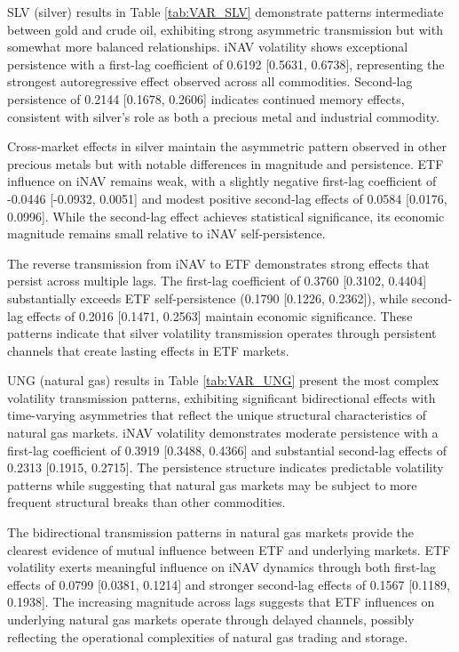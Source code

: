 SLV (silver) results in Table \ref{tab:VAR_SLV} demonstrate patterns intermediate between gold and crude oil, exhibiting strong asymmetric transmission but with somewhat more balanced relationships. iNAV volatility shows exceptional persistence with a first-lag coefficient of 0.6192 [0.5631, 0.6738], representing the strongest autoregressive effect observed across all commodities. Second-lag persistence of 0.2144 [0.1678, 0.2606] indicates continued memory effects, consistent with silver's role as both a precious metal and industrial commodity.

Cross-market effects in silver maintain the asymmetric pattern observed in other precious metals but with notable differences in magnitude and persistence. ETF influence on iNAV remains weak, with a slightly negative first-lag coefficient of -0.0446 [-0.0932, 0.0051] and modest positive second-lag effects of 0.0584 [0.0176, 0.0996]. While the second-lag effect achieves statistical significance, its economic magnitude remains small relative to iNAV self-persistence.

The reverse transmission from iNAV to ETF demonstrates strong effects that persist across multiple lags. The first-lag coefficient of 0.3760 [0.3102, 0.4404] substantially exceeds ETF self-persistence (0.1790 [0.1226, 0.2362]), while second-lag effects of 0.2016 [0.1471, 0.2563] maintain economic significance. These patterns indicate that silver volatility transmission operates through persistent channels that create lasting effects in ETF markets.

UNG (natural gas) results in Table \ref{tab:VAR_UNG} present the most complex volatility transmission patterns, exhibiting significant bidirectional effects with time-varying asymmetries that reflect the unique structural characteristics of natural gas markets. iNAV volatility demonstrates moderate persistence with a first-lag coefficient of 0.3919 [0.3488, 0.4366] and substantial second-lag effects of 0.2313 [0.1915, 0.2715]. The persistence structure indicates predictable volatility patterns while suggesting that natural gas markets may be subject to more frequent structural breaks than other commodities.

The bidirectional transmission patterns in natural gas markets provide the clearest evidence of mutual influence between ETF and underlying markets. ETF volatility exerts meaningful influence on iNAV dynamics through both first-lag effects of 0.0799 [0.0381, 0.1214] and stronger second-lag effects of 0.1567 [0.1189, 0.1938]. The increasing magnitude across lags suggests that ETF influences on underlying natural gas markets operate through delayed channels, possibly reflecting the operational complexities of natural gas trading and storage.

